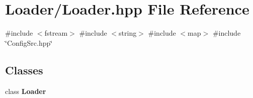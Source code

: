 \section{Loader/\+Loader.hpp File Reference}
\label{_loader_8hpp}
{\ttfamily \#include $<$fstream$>$}\newline
{\ttfamily \#include $<$string$>$}\newline
{\ttfamily \#include $<$map$>$}\newline
{\ttfamily \#include \char`\"{}Config\+Src.\+hpp\char`\"{}}\newline
\subsection*{Classes}
\begin{DoxyCompactItemize}
\item 
class \textbf{ Loader}
\end{DoxyCompactItemize}
